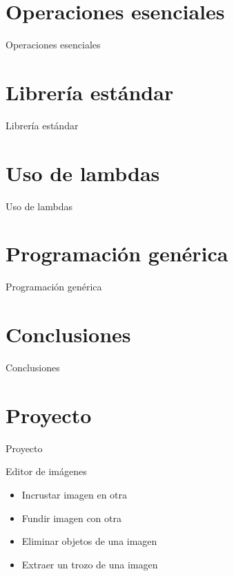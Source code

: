 \documentclass[aspectratio=169,presentation]{beamer}
\begin{document}
\section{Operaciones esenciales}
\label{sec:orgc9443f0}
\begin{frame}[label={sec:orgdb1182c}]{Operaciones esenciales}
\end{frame}
\section{Librería estándar}
\label{sec:org0073b9c}
\begin{frame}[label={sec:org55ce5d4}]{Librería estándar}
\end{frame}
\section{Uso de lambdas}
\label{sec:org1e1967d}
\begin{frame}[label={sec:org381ba41}]{Uso de lambdas}
\end{frame}
\section{Programación genérica}
\label{sec:orgd3ec24b}
\begin{frame}[label={sec:org6424676}]{Programación genérica}
\end{frame}
\section{Conclusiones}
\label{sec:org3045e7c}
\begin{frame}[label={sec:orga105361}]{Conclusiones}
\end{frame}
\section{Proyecto}
\label{sec:org7dfc298}
\begin{frame}[label={sec:orge1bba98}]{Proyecto}
\begin{block}{Editor de imágenes}
\begin{itemize}
\item Incrustar imagen en otra
\item Fundir imagen con otra
\item Eliminar objetos de una imagen
\item Extraer un trozo de una imagen
\end{itemize}
\end{block}
\end{frame}
\end{document}
